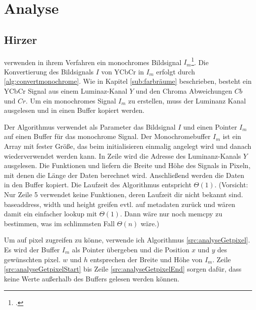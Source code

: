\section{Analyse} %
\label{sec:analyse}
\begin{comment}
	Detailierte Beschreibung der Algorithmen inkl. O-Notation (Nitty-Gritty Darstellung der Algos)
	1. ARToolKit
	2. ARToolKitPlus
	3. Zissermann/Clarke
	Analyse: Die auswertung nach den Kriterein aus Kap. Vorgehen OHNE WERTUNG! Nur die Daten erheben und auswerten.
\end{comment}

\subsection{Hirzer} %
\label{sub:hirzer}

\citeauthor{clarke96} verwenden in ihrem Verfahren ein monochromes Bildsignal $I_m$\footcite[Vgl.][S.~417]{clarke96}.
 Die Konvertierung des Bildsignals $I$ von YCbCr in $I_m$ erfolgt durch \autoref{alg:convertmonochrome}. Wie in Kapitel
 \ref{sub:farbräume} beschrieben, besteht ein YCbCr Signal aus einem Luminaz-Kanal $Y$ und den Chroma
 Abweichungen $Cb$ und $Cr$. Um ein monochromes Signal $I_m$ zu erstellen, muss der Luminanz Kanal ausgelesen und in
 einen Buffer kopiert werden.



Der Algorithmus verwendet als Parameter das Bildsignal $I$ und einen Pointer $I_m$ auf einen Buffer für das monochrome
 Signal. Der Monochromebuffer $I_m$ ist ein Array mit fester Größe, das beim initialisieren einmalig angelegt wird und
 danach wiederverwendet werden kann. In Zeile
  wird die Adresse des Luminanz-Kanals
 $Y$ ausgelesen. Die Funktionen  und  liefern die Breite und Höhe des Signals in
 Pixeln, mit denen die Länge der Daten berechnet wird. Anschließend werden die Daten in den Buffer kopiert. Die
 Laufzeit des Algorithmus entspricht $\Theta(1)$. (Vorsicht: Nur Zeile 5 verwendet keine Funktionen, deren Laufzeit dir
 nicht bekannt sind. baseaddress, width und height greifen evtl. auf metadaten zurück und wären damit ein einfacher
 lookup mit $\Theta(1)$. Dann wäre nur noch memcpy zu bestimmen, was im schlimmsten Fall $\Theta(n)$ wäre.)

Um auf \gls{pixel} zugreifen zu könne, verwende ich Algorithmus \ref{src:analyseGetpixel}. Es wird der Buffer $I_m$ als
 Pointer übergeben und die Position $x$ und $y$ des gewünschten \gls{pixel}. $w$ und $h$ entsprechen der Breite und
 Höhe von $I_m$. Zeile \ref{src:analyseGetpixelStart} bis Zeile \ref{src:analyseGetpixelEnd} sorgen dafür, dass keine
 Werte außerhalb des Buffers gelesen werden können.

